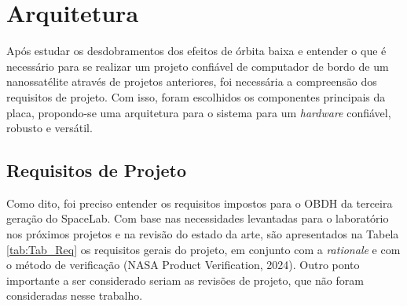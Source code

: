 \chapter{Arquitetura}

Após estudar os desdobramentos dos efeitos de órbita baixa e entender o que é necessário para se realizar um projeto confiável de computador de bordo de um nanossatélite através de projetos anteriores, foi necessária a compreensão dos requisitos de projeto. Com isso, foram escolhidos os componentes principais da placa, propondo-se uma arquitetura para o sistema para um \textit{hardware} confiável, robusto e versátil.  

\section{Requisitos de Projeto}

Como dito, foi preciso entender os requisitos impostos para o OBDH da terceira geração do SpaceLab. Com base nas necessidades levantadas para o laboratório nos próximos projetos e na revisão do estado da arte, são apresentados na Tabela \ref{tab:Tab_Req} os requisitos gerais do projeto, em conjunto com a \textit{rationale} e com o método de verificação (NASA Product Verification, 2024). Outro ponto importante a ser considerado seriam as revisões de projeto, que não foram consideradas nesse trabalho.

